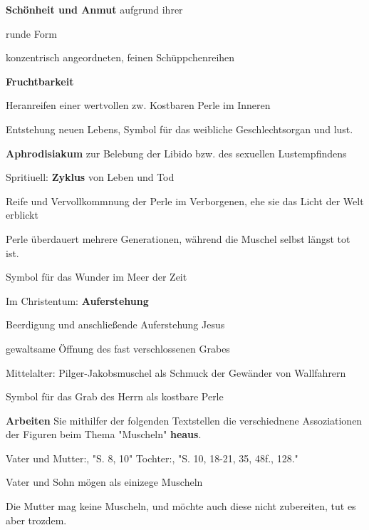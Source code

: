 \item {\bf Schönheit und Anmut} aufgrund ihrer
\startitemize[packed]
\item runde Form
\item konzentrisch angeordneten, feinen Schüppchenreihen
\stopitemize

\item {\bf Fruchtbarkeit}
\startitemize[packed]
\item Heranreifen einer wertvollen zw. Kostbaren Perle im Inneren
\item Entstehung neuen Lebens, Symbol für das weibliche Geschlechtsorgan und lust.
\stopitemize

\item {\bf Aphrodisiakum} zur Belebung der Libido bzw. des sexuellen Lustempfindens
\item Spritiuell: {\bf Zyklus} von Leben und Tod
\startitemize[packed]
\item Reife und Vervollkommnung der Perle im Verborgenen, ehe sie das Licht der Welt erblickt
\item Perle überdauert mehrere Generationen, während die Muschel selbst längst tot ist. 
\startitemize[packed]
\item Symbol für das Wunder im Meer der Zeit
\stopitemize
\stopitemize

\item Im Christentum: {\bf Auferstehung}
\startitemize[packed]
\item Beerdigung und anschließende Auferstehung Jesus
\item gewaltsame Öffnung des fast verschlossenen Grabes
\item Mittelalter: Pilger-Jakobsmuschel als Schmuck der Gewänder von Wallfahrern
\startitemize[packed]
\item Symbol für das Grab des Herrn als kostbare Perle
\stopitemize
\stopitemize

\stopitemize

\startframedtask
{\bf Arbeiten} Sie mithilfer der folgenden Textstellen die verschiednene Assoziationen der Figuren beim Thema "Muscheln" {\bf heaus}.

\blank

\bTABLE
\startCSV
Vater und Mutter:, "S. 8, 10"
Tochter:, "S. 10, 18-21, 35, 48f., 128."
\stopCSV
\eTABLE
\stopframedtask

\startitemize[packed]
\item Vater und Sohn mögen als einizege Muscheln
\item Die Mutter mag keine Muscheln, und möchte auch diese nicht zubereiten, tut es aber trozdem.
\stopitemize
